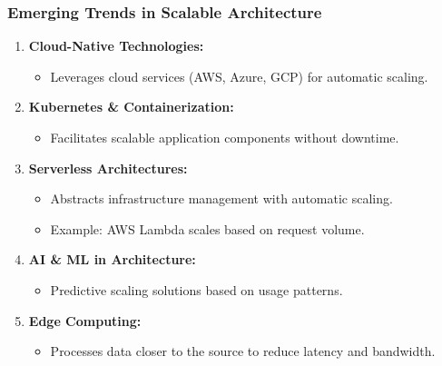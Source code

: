 \documentclass[aspectratio=169]{beamer}
\begin{document}
\begin{frame}[fragile]
    \frametitle{Emerging Trends in Scalable Architecture}

    \begin{enumerate}
        \item \textbf{Cloud-Native Technologies:}
        \begin{itemize}
            \item Leverages cloud services (AWS, Azure, GCP) for automatic scaling.
        \end{itemize}
        
        \item \textbf{Kubernetes \& Containerization:}
        \begin{itemize}
            \item Facilitates scalable application components without downtime.
        \end{itemize}
        
        \item \textbf{Serverless Architectures:}
        \begin{itemize}
            \item Abstracts infrastructure management with automatic scaling.
            \item Example: AWS Lambda scales based on request volume.
        \end{itemize}
        
        \item \textbf{AI \& ML in Architecture:}
        \begin{itemize}
            \item Predictive scaling solutions based on usage patterns.
        \end{itemize}
        
        \item \textbf{Edge Computing:}
        \begin{itemize}
            \item Processes data closer to the source to reduce latency and bandwidth.
        \end{itemize}
    \end{enumerate}
\end{frame}
\end{document}
